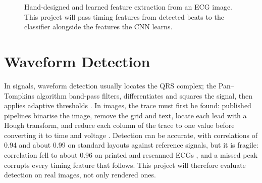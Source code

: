 \begin{figure}[!htbp]
  \centering
  \caption{Hand-designed and learned feature extraction from an ECG image. This project
    will pass timing features from detected beats to the classifier alongside the features the CNN learns.}
  \label{fig:feature-extraction}
\end{figure}

\section{Waveform Detection}
\label{sec:waveform}

In signals, waveform detection usually locates the QRS complex; the Pan--Tompkins algorithm band-pass filters, differentiates and squares the signal, then applies adaptive thresholds \cite{pan_real-time_1985}. In images, the trace must first be found: published pipelines binarise the image, remove the grid and text, locate each lead with a Hough transform, and reduce each column of the trace to one value before converting it to time and voltage \cite{wu_automated_2022}. Detection can be accurate, with correlations of 0.94 \cite{randazzo_development_2022} and about 0.99 on standard layouts \cite{wu_automated_2022} against reference signals, but it is fragile: correlation fell to about 0.96 on printed and rescanned ECGs \cite{wu_automated_2022}, and a missed peak corrupts every timing feature that follows. This project will therefore evaluate detection on real images, not only rendered ones.

